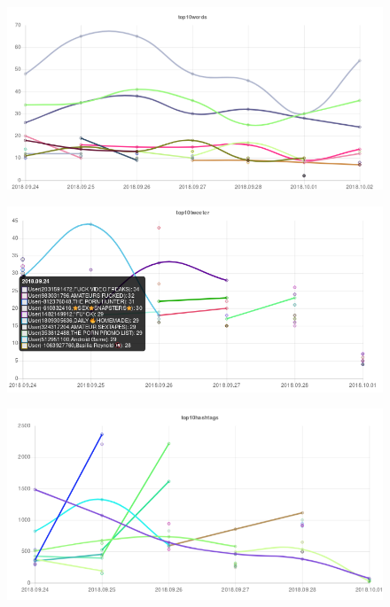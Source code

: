 \begin{figure}
\centering
\includegraphics[width=\textwidth]{bilder/BilderAnalyse-img4.png}
\end{figure}
\begin{figure}
\centering
\includegraphics[width=\textwidth]{bilder/BilderAnalyse-img5.png}
\end{figure}
\begin{figure}
\centering
\includegraphics[width=\textwidth]{bilder/BilderAnalyse-img6.png}
\end{figure}
